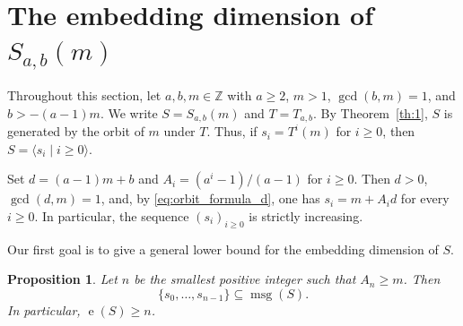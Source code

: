 \documentclass[12pt,a4paper]{amsart}
\newtheorem{proposition}[theorem]{Proposition}
\theoremstyle{definition}
\begin{document}
\section{\texorpdfstring{The embedding dimension of $S_{a,b}(m)$}{The embedding dimension}}\label{Sect:e}

Throughout this section, let $a,b,m\in\mathbb{Z}$ with $a\ge 2$,
$m>1$, $\gcd(b,m)=1$, and $b>-(a-1)m$. We write
$S=S_{a,b}(m)$ and $T=T_{a,b}$. By Theorem~\ref{th:1}, $S$ is generated
by the orbit of $m$ under $T$. Thus, if $s_i=T^i(m)$ for $i\ge 0$, then
$S=\langle s_i\mid i\ge 0\rangle$.

Set $d=(a-1)m+b$ and $A_i=(a^i-1)/(a-1)$ for $i\ge 0$. Then $d>0$,
$\gcd(d,m)=1$, and, by \eqref{eq:orbit_formula_d}, one has
$s_i=m+A_id$ for every $i\ge 0$. In particular, the sequence
$(s_i)_{i\ge 0}$ is strictly increasing.

Our first goal is to give a general lower bound for the embedding
dimension of $S$.

\begin{proposition}\label{prop:3}
Let $n$ be the smallest positive integer such that $A_n\ge m$. Then
\[\{s_0,\ldots,s_{n-1}\}\subseteq \operatorname{msg}(S).\] In particular, $\operatorname{e}(S)\ge n$.
\end{proposition}
\end{document}
